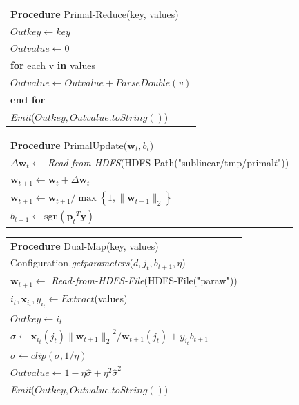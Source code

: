 \documentclass{llncs}
\newcommand{\bw}{\mathbf{w}}
\newcommand{\bp}{\mathbf{p}}
\newcommand{\lc}{\left(}
\newcommand{\rc}{\right)}
\newcommand{\tspace}{\hspace*{2em}}
\def\sgn{\mathrm{sgn}}
\begin{document}
    \begin{table}[ht]
	\begin{tabular}{l}
	\hline\noalign{\smallskip}
	\textbf{Procedure} Primal-Reduce(key, values) \\
	\noalign{\smallskip}
	\hline
	\noalign{\smallskip}
        $Outkey \leftarrow key$ \\
        $Outvalue \leftarrow 0$ \\
        \textbf{for} each v \textbf{in} values \\
        \tspace $Outvalue \leftarrow Outvalue+\textit{ParseDouble}(v) $ \\
        \textbf{end for} \\
        \textit{Emit}($Outkey, Outvalue.\textit{toString}()$) \\
	\hline
	\end{tabular}
	\end{table}

    \begin{table}[ht]
	\begin{tabular}{l}
	\hline\noalign{\smallskip}
	\textbf{Procedure} PrimalUpdate($\bw_t, b_t$) \\
	\noalign{\smallskip}
	\hline
	\noalign{\smallskip}
        $\Delta \bw_t \leftarrow$ \textit{Read-from-HDFS}(HDFS-Path("sublinear/tmp/primal$t$")) \\
        $\bw_{t+1} \leftarrow \bw_t+\Delta \bw_t$ \\
		${\bw}_{t+1}\leftarrow {\bw}_{t+1}/\max \left\{1,\|{\bw}_{t+1}\|_2 \right\}$ \\
        ${b}_{t+1}\leftarrow \sgn\lc {{\bp}_{t}}^{T}\mathbf{y}\rc$ \\
	\hline
	\end{tabular}
	\end{table}

    \begin{table}[ht]
	\begin{tabular}{l}
	\hline\noalign{\smallskip}
	\textbf{Procedure} Dual-Map(key, values) \\
	\noalign{\smallskip}
	\hline
	\noalign{\smallskip}
        Configuration\textit{.getparameters}($d, j_t, b_{t+1}, \eta$) \\
        $\bw_{t+1} \leftarrow$ \textit{Read-from-HDFS-File}(HDFS-File("paraw")) \\
        $i_t, \mathbf{x}_{i_t}, y_{i_t} \leftarrow \textit{Extract}$(values)   \\
        $Outkey \leftarrow i_t$ \\
        $\sigma \leftarrow \mathbf{x}_{i_t} \lc {j}_{t}\rc{\|{\bw}_{t+1}\|_2}^{2}/{\bw}_{t+1}\lc {j}_{t} \rc+{y}_{i_t}{b}_{t+1}$ \\
		$\hat{\sigma} \leftarrow clip\lc \sigma,1/\eta \rc$ \\
		$Outvalue \leftarrow 1-\eta\hat{\sigma} + {\eta}^{2}{\hat{\sigma}}^{2} $ \\
        \textit{Emit}($Outkey, Outvalue.\textit{toString}()$) \\
	\hline
	\end{tabular}
	\end{table}
\end{document}

